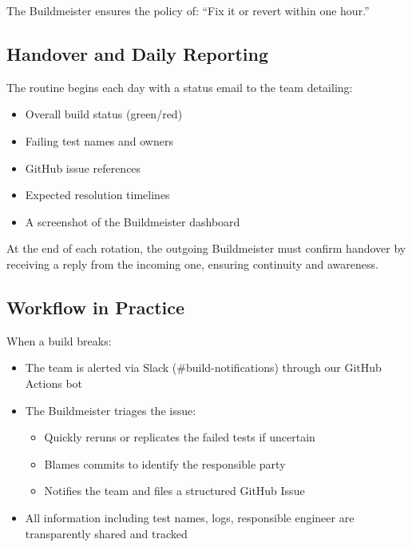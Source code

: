The Buildmeister ensures the policy of: ``Fix it or revert within one hour.''

\subsection{Handover and Daily Reporting}

The routine begins each day with a status email to the team detailing:

\begin{itemize}
  \item Overall build status (green/red)

  \item Failing test names and owners

  \item GitHub issue references

  \item Expected resolution timelines

  \item A screenshot of the Buildmeister dashboard
\end{itemize}

At the end of each rotation, the outgoing Buildmeister must confirm handover
by receiving a reply from the incoming one, ensuring continuity and awareness.

\subsection{Workflow in Practice}

When a build breaks:

\begin{itemize}
  \item The team is alerted via Slack (\#build-notifications) through
    our GitHub Actions bot

  \item The Buildmeister triages the issue:

    \begin{itemize}
      \item Quickly reruns or replicates the failed tests if uncertain

      \item Blames commits to identify the responsible party

      \item Notifies the team and files a structured GitHub Issue
    \end{itemize}

  \item All information including test names, logs, responsible engineer
    are transparently shared and tracked
\end{itemize}


